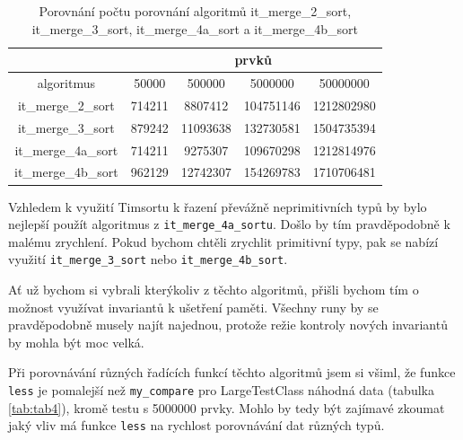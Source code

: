 \documentclass[thesis=B,czech]{FITthesis}[2019/12/23]
\begin{document}
\begin{table}[htbp]\centering
 	\caption[Porovnání počtu porovnání algoritmů it\_merge\_2\_sort,\linebreak it\_merge\_3\_sort, it\_merge\_4a\_sort a it\_merge\_4b\_sort]{Porovnání počtu porovnání algoritmů it\_merge\_2\_sort, it\_merge\_3\_sort, it\_merge\_4a\_sort a it\_merge\_4b\_sort}\label{tab:tab3}
 	\begin{tabular}{|c|c|c|c|c|}\hline 
 	& \multicolumn{4}{c|}{prvků} \tabularnewline \hline
algoritmus & 50000 & 500000 & 5000000 & 50000000 \tabularnewline \hline\hline
it\_merge\_2\_sort & 714211 & 8807412 & 104751146 & 1212802980 \tabularnewline \hline
it\_merge\_3\_sort & 879242 & 11093638 & 132730581 & 1504735394 \tabularnewline \hline
it\_merge\_4a\_sort & 714211 & 9275307 & 109670298 & 1212814976 \tabularnewline \hline
it\_merge\_4b\_sort & 962129 & 12742307 & 154269783 & 1710706481 \tabularnewline \hline

	\end{tabular}
\end{table}

Vzhledem k využití Timsortu k řazení převážně neprimitivních typů by bylo nejlepší použít algoritmus z \texttt{it\_merge\_4a\_sortu}. Došlo by tím pravděpodobně k malému zrychlení. Pokud bychom chtěli zrychlit primitivní typy, pak se nabízí využití \texttt{it\_merge\_3\_sort} nebo \texttt{it\_merge\_4b\_sort}.

Ať už bychom si vybrali kterýkoliv z těchto algoritmů, přišli bychom tím o možnost využívat invariantů k ušetření paměti. Všechny runy by se pravděpodobně musely najít najednou, protože režie kontroly nových invariantů by mohla být moc velká.

Při porovnávání různých řadících funkcí těchto algoritmů jsem si všiml, že funkce \texttt{less} je pomalejší než \texttt{my\_compare} pro LargeTestClass náhodná data (tabulka \ref{tab:tab4}), kromě testu s 5000000 prvky. Mohlo by tedy být zajímavé zkoumat jaký vliv má funkce \texttt{less} na rychlost porovnávání dat různých typů.
\end{document}
